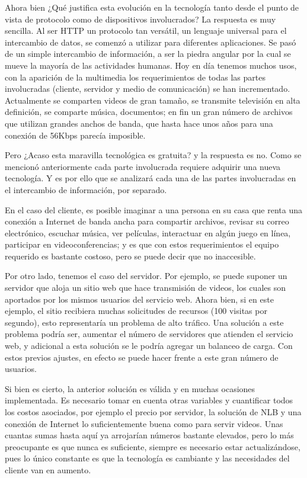 Ahora bien ¿Qué justifica esta evolución en la tecnología tanto desde el punto de vista de protocolo como de dispositivos involucrados? La respuesta es muy sencilla. Al ser HTTP un protocolo tan versátil, un lenguaje universal para el intercambio de datos, se comenzó a utilizar para diferentes aplicaciones. Se pasó de un simple intercambio de información, a ser la piedra angular por la cual se mueve la mayoría de las actividades humanas. Hoy en día tenemos muchos usos, con la aparición de la multimedia los requerimientos de todas las partes involucradas (cliente, servidor y medio de comunicación) se han incrementado. Actualmente se comparten videos de gran tamaño, se transmite televisión en alta definición, se comparte música, documentos; en fin un gran número de archivos que utilizan grandes anchos de banda, que hasta hace unos años para una conexión de 56Kbps parecía imposible.

Pero ¿Acaso esta maravilla tecnológica es gratuita? y la respuesta es no. Como se mencionó anteriormente cada parte involucrada requiere adquirir una nueva tecnología. Y es por ello que se analizará cada una de las partes involucradas en el intercambio de información, por separado. 

En el caso del cliente, es posible imaginar a una persona en su casa que renta una conexión a Internet de banda ancha para compartir archivos, revisar su correo electrónico, escuchar música, ver películas, interactuar en algún juego en línea, participar en videoconferencias; y es que con estos requerimientos el equipo requerido es bastante costoso, pero se puede decir que no inaccesible. 

Por otro lado, tenemos el caso del servidor. Por ejemplo, se puede suponer un servidor que aloja un sitio web que hace transmisión de videos, los cuales son aportados por los mismos usuarios del servicio web. Ahora bien, si en este ejemplo, el sitio recibiera muchas solicitudes de recursos (100 visitas por segundo), esto representaría un problema de alto tráfico. Una solución a este problema podría ser, aumentar el número de servidores que atienden el servicio web, y adicional a esta solución se le podría agregar un balanceo de carga. Con estos previos ajustes, en efecto se puede hacer frente a este gran número de usuarios. 

Si bien es cierto, la anterior solución es válida y en muchas ocasiones implementada. Es necesario tomar en cuenta otras variables y cuantificar todos los costos asociados, por ejemplo el precio por servidor, la solución de NLB y una conexión de Internet lo suficientemente buena como para servir videos. Unas cuantas sumas hasta aquí ya arrojarían números bastante elevados, pero lo más preocupante es que nunca es suficiente, siempre es necesario estar actualizándose, pues lo único constante es que la tecnología es cambiante y las necesidades del cliente van en aumento. 

